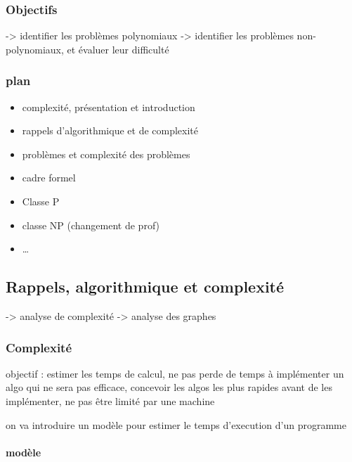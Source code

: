 \hypertarget{objectifs}{%
\subsubsection{Objectifs}\label{objectifs}}

-\textgreater{} identifier les problèmes polynomiaux -\textgreater{}
identifier les problèmes non-polynomiaux, et évaluer leur difficulté

\hypertarget{plan-1}{%
\subsubsection{plan}\label{plan-1}}

\begin{itemize}
\tightlist
\item
  complexité, présentation et introduction
\item
  rappels d'algorithmique et de complexité
\item
  problèmes et complexité des problèmes
\item
  cadre formel
\item
  Classe P
\item
  classe NP (changement de prof)
\item
  \ldots{}
\end{itemize}

\hypertarget{rappels-algorithmique-et-complexituxe9}{%
\subsection{Rappels, algorithmique et
complexité}\label{rappels-algorithmique-et-complexituxe9}}

-\textgreater{} analyse de complexité -\textgreater{} analyse des
graphes

\hypertarget{complexituxe9}{%
\subsubsection{Complexité}\label{complexituxe9}}

objectif : estimer les temps de calcul, ne pas perde de temps à
implémenter un algo qui ne sera pas efficace, concevoir les algos les
plus rapides avant de les implémenter, ne pas être limité par une
machine

on va introduire un modèle pour estimer le temps d'execution d'un
programme

\hypertarget{moduxe8le}{%
\paragraph{modèle}\label{moduxe8le}}

